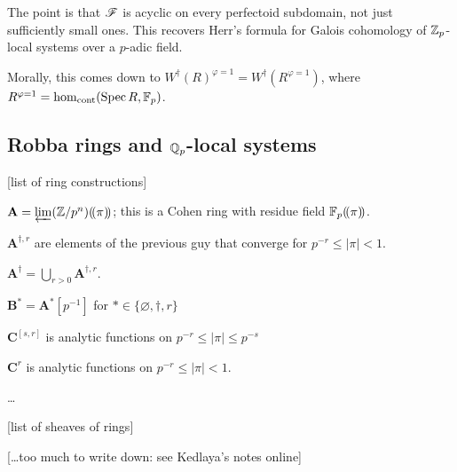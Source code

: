 The point is that $\mathscr{F}$ is acyclic on every perfectoid subdomain, not just sufficiently 
small ones. This recovers Herr's formula for Galois cohomology of 
$\mathbb{Z}_p$-local systems over a $p$-adic field. 

Morally, this comes down to $W^\dagger(R)^{\varphi=1} = W^\dagger(R^{\varphi=1})$, 
where $R^{\varphi=1} = \hom_\text{cont}(\operatorname{Spec} R,\mathbb{F}_p)$. 





\subsection{Robba rings and \texorpdfstring{$\mathbb{Q}_p$}{Qp}-local systems}

[list of ring constructions]

$\mathbf A=\varprojlim (\mathbb{Z}/p^n)(\!( {\pi} )\!)$; this is a Cohen ring with residue 
field $\mathbb{F}_p(\!( {\pi} )\!)$. 

$\mathbf A^{\dagger,r}$ are elements of the previous guy that converge for 
$p^{-r}\leqslant |\pi|<1$. 

$\mathbf A^\dagger=\bigcup_{r>0} \mathbf A^{\dagger,r}$. 

$\mathbf B^\ast = \mathbf A^\ast[p^{-1}]$ for $\ast\in \{\varnothing,\dagger,r\}$

$\mathbf C^{[s,r]}$ is analytic functions on $p^{-r}\leqslant |\pi|\leqslant p^{-s}$

$\mathbf C^r$ is analytic functions on $p^{-r}\leqslant |\pi|<1$. 

\ldots

[list of sheaves of rings]

[\ldots too much to write down: see Kedlaya's notes online]







